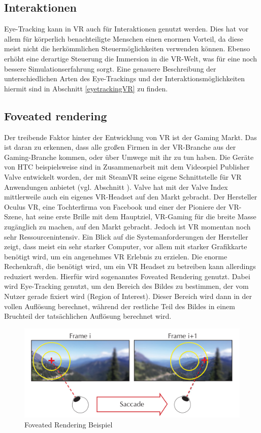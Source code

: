 \subsection{Interaktionen}
Eye-Tracking kann in VR auch für Interaktionen genutzt werden. Dies hat vor allem für körperlich benachteiligte Menschen einen enormen Vorteil, da diese meist nicht die herkömmlichen Steuermöglichkeiten verwenden können. Ebenso erhöht eine derartige Steuerung die Immersion in die VR-Welt, was für eine noch bessere Simulationserfahrung sorgt. Eine genauere Beschreibung der unterschiedlichen Arten des Eye-Trackings und der Interaktionsmöglichkeiten hiermit sind in Abschnitt \ref{eyetrackingVR} zu finden.

\subsection{Foveated rendering}
Der treibende Faktor hinter der Entwicklung von VR ist der Gaming Markt. Das ist daran zu erkennen, dass alle großen Firmen in der VR-Branche aus der Gaming-Branche kommen, oder über Umwege mit ihr zu tun haben. Die Geräte von HTC beispielsweise sind in Zusammenarbeit mit dem Videospiel Publisher Valve entwickelt worden, der mit SteamVR seine eigene Schnittstelle für VR Anwendungen anbietet (vgl. Abschnitt ). Valve hat mit der Valve Index mittlerweile auch ein eigenes VR-Headset auf den Markt gebracht. Der Hersteller Oculus VR, eine Tochterfirma von Facebook und einer der Pioniere der VR-Szene, hat seine erste Brille mit dem Hauptziel, VR-Gaming für die breite Masse zugänglich zu machen, auf den Markt gebracht\cite{OculusKickstarter}. Jedoch ist VR momentan noch sehr Ressourcenintensiv. Ein Blick auf die Systemanforderungen der Hersteller zeigt, dass meist ein sehr starker Computer, vor allem mit starker Grafikkarte benötigt wird, um ein angenehmes VR Erlebnis zu erzielen\cite{Lang.2019}. Die enorme Rechenkraft, die benötigt wird, um ein VR Headset zu betreiben kann allerdings reduziert werden. Hierfür wird sogenanntes Foveated Rendering genutzt. Dabei wird Eye-Tracking genutzt, um den Bereich des Bildes zu bestimmen, der vom Nutzer gerade fixiert wird (Region of Interest). Dieser Bereich wird dann in der vollen Auflösung berechnet, während der restliche Teil des Bildes in einem Bruchteil der tatsächlichen Auflösung berechnet wird. 
\begin{figure}
	\includegraphics[width=\linewidth]{images/foveated_rendering}
	\caption{Foveated Rendering Beispiel \cite{Albert.2017}}
	\label{fig:foveated}
\end{figure}


